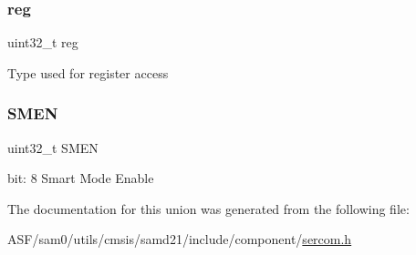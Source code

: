 \subsubsection{\texorpdfstring{reg}{reg}}
{\footnotesize\ttfamily uint32\+\_\+t reg}

Type used for register access \mbox{\label{union_s_e_r_c_o_m___i2_c_m___c_t_r_l_b___type_a31bff5f79c11bb1b5fe501ccb4738f12}} 
\subsubsection{\texorpdfstring{SMEN}{SMEN}}
{\footnotesize\ttfamily uint32\+\_\+t S\+M\+EN}

bit\+: 8 Smart Mode Enable 

The documentation for this union was generated from the following file\+:\begin{DoxyCompactItemize}
\item 
A\+S\+F/sam0/utils/cmsis/samd21/include/component/\mbox{\hyperlink{utils_2cmsis_2samd21_2include_2component_2sercom_8h}{sercom.\+h}}\end{DoxyCompactItemize}
